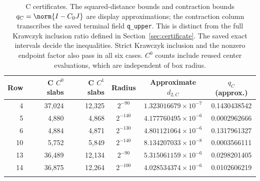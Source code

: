 \begin{longtable}{@{}rrrccc@{}}
\toprule
Row & C $C^0$ slabs & C $C^1$ slabs & Radius & Approximate $d_{2,C}$ & $q_C$ (approx.)\\
\midrule
4 & 37,024 & 12,325 & $2^{-90}$ & $1.323016679\times10^{-7}$ & 0.1430438542\\
5 & 4,880 & 4,868 & $2^{-140}$ & $4.177760495\times10^{-6}$ & 0.0002962666\\
6 & 4,884 & 4,871 & $2^{-130}$ & $4.801121064\times10^{-6}$ & 0.1317961327\\
10 & 5,752 & 5,849 & $2^{-140}$ & $8.134207033\times10^{-8}$ & 0.0003566111\\
13 & 36,489 & 12,134 & $2^{-90}$ & $5.315061159\times10^{-6}$ & 0.0298201405\\
14 & 36,875 & 12,264 & $2^{-100}$ & $4.028534374\times10^{-6}$ & 0.0102606219\\
\bottomrule
\caption{C certificates. The squared-distance bounds and contraction
bounds $q_C=\norm{I-C_0J}$ are display approximations; the contraction
column transcribes the saved terminal field \texttt{q\_upper}. This is
distinct from the full Krawczyk inclusion ratio defined in
Section~\ref{sec:certificate}. The saved exact intervals decide the
inequalities. Strict Krawczyk inclusion and the
nonzero endpoint factor also pass in all six cases. $C^0$ counts
include reused center evaluations, which are independent of box radius.}
\label{tab:capd}
\end{longtable}
